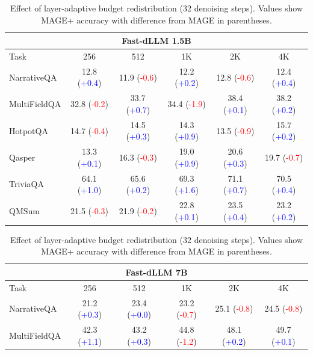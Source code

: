 \begin{table}[h]
\centering
\small
\caption{Effect of layer-adaptive budget redistribution (32 denoising steps). Values show MAGE+ accuracy with difference from MAGE in parentheses.}
\label{tab:ablation_sidebyside}
\begin{tabular*}{\columnwidth}{@{\extracolsep{\fill}}l|ccccc}
\toprule
\multicolumn{6}{c}{\textbf{Fast-dLLM 1.5B}} \\
\midrule
Task & 256 & 512 & 1K & 2K & 4K \\
\midrule
NarrativeQA & 12.8 (\textcolor{blue}{+0.4}) & 11.9 (\textcolor{red}{-0.6}) & 12.2 (\textcolor{blue}{+0.2}) & 12.8 (\textcolor{red}{-0.6}) & 12.4 (\textcolor{blue}{+0.4}) \\
MultiFieldQA & 32.8 (\textcolor{red}{-0.2}) & 33.7 (\textcolor{blue}{+0.7}) & 34.4 (\textcolor{red}{-1.9}) & 38.4 (\textcolor{blue}{+0.1}) & 38.2 (\textcolor{blue}{+0.2}) \\
HotpotQA & 14.7 (\textcolor{red}{-0.4}) & 14.5 (\textcolor{blue}{+0.3}) & 14.3 (\textcolor{blue}{+0.9}) & 13.5 (\textcolor{red}{-0.9}) & 15.7 (\textcolor{blue}{+0.2}) \\
Qasper & 13.3 (\textcolor{blue}{+0.1}) & 16.3 (\textcolor{red}{-0.3}) & 19.0 (\textcolor{blue}{+0.9}) & 20.6 (\textcolor{blue}{+0.3}) & 19.7 (\textcolor{red}{-0.7}) \\
TriviaQA & 64.1 (\textcolor{blue}{+1.0}) & 65.6 (\textcolor{blue}{+0.2}) & 69.3 (\textcolor{blue}{+1.6}) & 71.1 (\textcolor{blue}{+0.7}) & 70.5 (\textcolor{blue}{+0.4}) \\
QMSum & 21.5 (\textcolor{red}{-0.3}) & 21.9 (\textcolor{red}{-0.2}) & 22.8 (\textcolor{blue}{+0.1}) & 23.5 (\textcolor{blue}{+0.4}) & 23.2 (\textcolor{blue}{+0.2}) \\
\bottomrule
\end{tabular*}
\vspace{0.5em}
\begin{tabular*}{\columnwidth}{@{\extracolsep{\fill}}l|ccccc}
\toprule
\multicolumn{6}{c}{\textbf{Fast-dLLM 7B}} \\
\midrule
Task & 256 & 512 & 1K & 2K & 4K \\
\midrule
NarrativeQA & 21.2 (\textcolor{blue}{+0.3}) & 23.4 (\textcolor{blue}{+0.0}) & 23.2 (\textcolor{red}{-0.7}) & 25.1 (\textcolor{red}{-0.8}) & 24.5 (\textcolor{red}{-0.8}) \\
MultiFieldQA & 42.3 (\textcolor{blue}{+1.1}) & 43.2 (\textcolor{blue}{+0.3}) & 44.8 (\textcolor{red}{-1.2}) & 48.1 (\textcolor{blue}{+0.2}) & 49.7 (\textcolor{blue}{+0.1}) \\

\end{tabular*}
\end{table}
